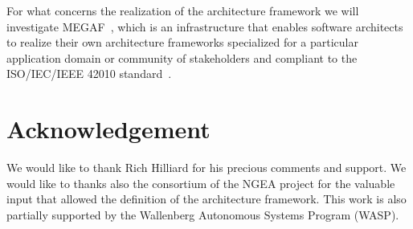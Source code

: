 For what concerns the realization of the architecture framework we will investigate MEGAF~\cite{MEGAF2010,MEGAF2012}, 
%
%
which is an infrastructure that enables software architects to realize their
own architecture frameworks specialized for a particular
application domain or community of stakeholders and compliant to the ISO/IEC/IEEE 42010 standard~\cite{42010}. 

\section*{Acknowledgement}

We would like to thank Rich Hilliard for his precious comments and support. We would like to thanks also the consortium of the NGEA project for the valuable input that allowed the definition of the architecture framework.
This work is also partially supported by the Wallenberg Autonomous Systems Program (WASP).
